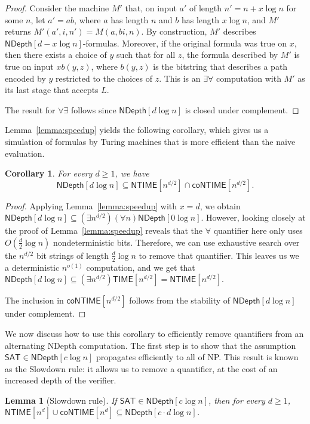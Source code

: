 \documentclass[a4paper, 11pt]{article}
\theoremstyle{plain}
\newtheorem{lemma}[theorem]{Lemma}
\newtheorem{corollary}[theorem]{Corollary}
\theoremstyle{definition}
\theoremstyle{remark}
\newcommand{\NP}{\textsf{NP}}%
\newcommand{\TIME}{\textsf{TIME}}%
\newcommand{\NTIME}{\textsf{NTIME}}%
\newcommand{\coNTIME}{\textsf{coNTIME}}%
\newcommand{\SAT}{\textsf{SAT}}%
\newcommand{\ND}{\textsf{NDepth}}%
\newcommand{\NDL}[1]{\ND\left[ #1 \log n\right]}%
\begin{document}
\begin{proof}
	Consider the machine $M'$ that,
	on input $a'$ of length $n' = n + x\log n$ for some $n$,
	let $a' = ab$, where $a$ has length $n$ and $b$ has length $x\log n$,
	and $M'$ returns $M'(a', i, n') = M(a, bi, n)$.
	By construction, $M'$ describes $\NDL{d-x}$-formulas.
	Moreover, if the original formula was true on $x$, 
	then there exists a choice of $y$ such that for all $z$,
	the formula described by $M'$ is true on input $xb(y,z)$,
	where $b(y,z)$ is the bitstring that describes a path 
	encoded by $y$ restricted to the choices of $z$.
	This is an $\exists\forall$ computation with $M'$ as its last stage that accepts $L$.

	The result for $\forall\exists$ follows since $\NDL{d}$ is closed under complement.
\end{proof}

Lemma~\ref{lemma:speedup} yields the following corollary,
which gives us a simulation of formulas by Turing machines that is more efficient
than the naive evaluation.
\begin{corollary}\label{cor:speedup}
	For every $d \ge 1$, we have
	\[\NDL{d} \subseteq \NTIME[n^{d/2}] \cap \coNTIME[n^{d/2}].\]
\end{corollary}
\begin{proof}
	Applying Lemma~\ref{lemma:speedup} with $x = d$, we obtain
	$\NDL{d} \subseteq (\exists n^{d/2}) (\forall n) \NDL{0}$.
	However, looking closely at the proof of Lemma~\ref{lemma:speedup}
	reveals that the $\forall$ quantifier here only uses $O(\frac{d}{2}\log n)$
	nondeterministic bits.
	Therefore, we can use exhaustive search over the $n^{d/2}$ bit strings of length $\frac{d}{2}\log n$
	to remove that quantifier.
	This leaves us we a deterministic $n^{o(1)}$ computation, and we get that
	$\NDL{d} \subseteq (\exists n^{d/2}) \TIME[n^{d/2}] = \NTIME[n^{d/2}]$.

	The inclusion in $\coNTIME[n^{d/2}]$ follows from the stability of $\NDL{d}$
	under complement.
\end{proof}

We now discuss how to use this corollary to
efficiently remove quantifiers from an alternating \ND{} computation.
The first step is to show that the assumption $\SAT\in\NDL{c}$
propagates efficiently to all of \NP{}.
This result is known as the Slowdown rule: it allows us to remove a quantifier,
at the cost of an increased depth of the verifier.
\begin{lemma}[Slowdown rule]\label{lemma:slowdown}
	If $\SAT{}\in \NDL{c}$, then for every $d \ge 1$, $\NTIME[n^d] \cup \coNTIME[n^d] \subseteq \NDL{c\cdot d}$.
\end{lemma}
\end{document}

